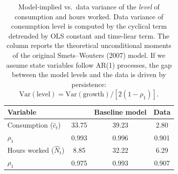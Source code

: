 \begin{table}[htbp]
\centering
\caption{Model-implied vs.\ data variance of the \emph{level} of consumption and
hours worked. Data variance of consumption level is computed by the cyclical term detrended by OLS constant and time-liear term. The \cite{smetsShocksFrictionsUS2007} column reports the theoretical unconditional moments of the original Smets--Wouters (2007) model. If we assume state variables follow AR(1) processes, the gap between the model levels and the data is driven by persistence:
$\mathrm{Var}(\text{level})= \mathrm{Var}(\text{growth})/[2(1-\rho_1)]$.}
\label{tab:var_level_sw2007_vs_baseline}
\begin{tabular}{lccc}
\hline\hline
Variable & \cite{smetsShocksFrictionsUS2007} & Baseline model & Data \\
\hline
Consumption ($\hat{c}_t$) & 33.75 & 39.23 & 2.80 \\
\quad $\rho_1$    & 0.993 & 0.996 & 0.901 \\
Hours worked ($\hat{N}_t$)& 8.85  & 32.22 & 6.29 \\
\quad $\rho_1$    & 0.975 & 0.993 & 0.907 \\
\hline
\end{tabular}
\end{table}
